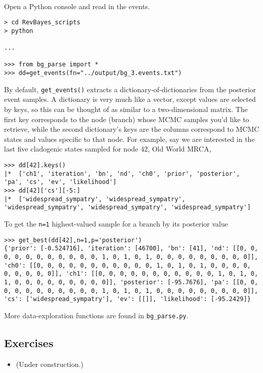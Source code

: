 \noindent \\ \impmark  Open a Python console and read in the events.

\begin{snugshade}
\begin{lstlisting}
> cd RevBayes_scripts
> python

...

>>> from bg_parse import *
>>> dd=get_events(fn="../output/bg_3.events.txt")
\end{lstlisting}
\end{snugshade}

By default, {\tt get\_events()} extracts a dictionary-of-dictionaries from the posterior event samples.
A dictionary is very much like a vector, except values are selected by keys, so this can be thought of as similar to a two-dimensional matrix.
The first key corresponds to the node (branch) whose MCMC samples you'd like to retrieve, while the second dictionary's keys are the columns correspond to MCMC states and values specific to that node. For example, say we are interested in the last five cladogenic states sampled for node 42, Old World MRCA,
\begin{snugshade}
\begin{lstlisting}
>>> dd[42].keys()
|*  ['ch1', 'iteration', 'bn', 'nd', 'ch0', 'prior', 'posterior', 'pa', 'cs', 'ev', 'likelihood']
>>> dd[42]['cs'][-5:]
|*  ['widespread_sympatry', 'widespread_sympatry', 'widespread_sympatry', 'widespread_sympatry', 'widespread_sympatry']
\end{lstlisting}
\end{snugshade}

To get the {\tt n=1} highest-valued sample for a branch by its posterior value
\begin{snugshade}
\begin{lstlisting}
>>> get_best(dd[42],n=1,p='posterior')
{'prior': [-0.524716], 'iteration': [46700], 'bn': [41], 'nd': [[0, 0, 0, 0, 0, 0, 0, 0, 0, 0, 0, 1, 0, 1, 0, 1, 0, 0, 0, 0, 0, 0, 0, 0, 0]], 'ch0': [[0, 0, 0, 0, 0, 0, 0, 0, 0, 0, 0, 1, 0, 1, 0, 1, 0, 0, 0, 0, 0, 0, 0, 0, 0]], 'ch1': [[0, 0, 0, 0, 0, 0, 0, 0, 0, 0, 0, 1, 0, 1, 0, 1, 0, 0, 0, 0, 0, 0, 0, 0, 0]], 'posterior': [-95.7676], 'pa': [[0, 0, 0, 0, 0, 0, 0, 0, 0, 0, 0, 1, 0, 1, 0, 1, 0, 0, 0, 0, 0, 0, 0, 0, 0]], 'cs': ['widespread_sympatry'], 'ev': [[]], 'likelihood': [-95.2429]}
\end{lstlisting}
\end{snugshade}

More data-exploration functions are found in {\tt bg\_parse.py}.

\subsection{Exercises}

\begin{itemize}
\item (Under construction.)
\end{itemize}
